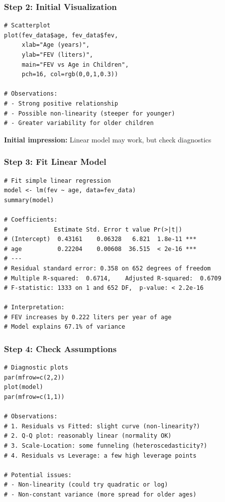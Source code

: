 \documentclass{beamer}
\begin{document}
\begin{frame}[fragile]
\frametitle{Step 2: Initial Visualization}
\small
\begin{verbatim}
# Scatterplot
plot(fev_data$age, fev_data$fev,
     xlab="Age (years)",
     ylab="FEV (liters)",
     main="FEV vs Age in Children",
     pch=16, col=rgb(0,0,1,0.3))

# Observations:
# - Strong positive relationship
# - Possible non-linearity (steeper for younger)
# - Greater variability for older children
\end{verbatim}

\vspace{0.2cm}
\normalsize
\textbf{Initial impression:} Linear model may work, but check diagnostics
\end{frame}

\begin{frame}[fragile]
\frametitle{Step 3: Fit Linear Model}
\small
\begin{verbatim}
# Fit simple linear regression
model <- lm(fev ~ age, data=fev_data)
summary(model)

# Coefficients:
#             Estimate Std. Error t value Pr(>|t|)
# (Intercept)  0.43161    0.06328   6.821  1.8e-11 ***
# age          0.22204    0.00608  36.515  < 2e-16 ***
# ---
# Residual standard error: 0.358 on 652 degrees of freedom
# Multiple R-squared:  0.6714,    Adjusted R-squared:  0.6709
# F-statistic: 1333 on 1 and 652 DF,  p-value: < 2.2e-16

# Interpretation:
# FEV increases by 0.222 liters per year of age
# Model explains 67.1% of variance
\end{verbatim}
\end{frame}

\begin{frame}[fragile]
\frametitle{Step 4: Check Assumptions}
\small
\begin{verbatim}
# Diagnostic plots
par(mfrow=c(2,2))
plot(model)
par(mfrow=c(1,1))

# Observations:
# 1. Residuals vs Fitted: slight curve (non-linearity?)
# 2. Q-Q plot: reasonably linear (normality OK)
# 3. Scale-Location: some funneling (heteroscedasticity?)
# 4. Residuals vs Leverage: a few high leverage points

# Potential issues:
# - Non-linearity (could try quadratic or log)
# - Non-constant variance (more spread for older ages)
\end{verbatim}
\end{frame}
\end{document}
